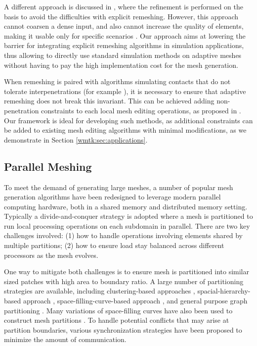 A different approach is discussed in \cite{Grinspun:2002}, where the refinement is performed on the basis to avoid the difficulties with explicit remeshing. However, this approach cannot coarsen a dense input, and also cannot increase the quality of elements, making it usable only for specific scenarios \cite{Grinspun:2002}. Our approach aims at lowering the barrier for integrating explicit remeshing algorithms in simulation applications, thus allowing to directly use standard simulation methods on adaptive meshes without having to pay the high implementation cost for the mesh generation.

When remeshing is paired with algorithms simulating contacts that do not tolerate interpenetrations (for example \cite{Li2020IPC}), it is necessary to ensure that adaptive remeshing does not break this invariant. This can be achieved adding non-penetration constraints to each local mesh editing operations, as proposed in \cite{Brochu:2012}. Our framework is ideal for developing such methods, as additional constraints can be added to existing mesh editing algorithms with minimal modifications, as we demonstrate in Section \ref{wmtk:sec:applications}.


\subsection{Parallel Meshing}

To meet the demand of generating large meshes,
a number of popular mesh generation algorithms have been redesigned to
leverage modern parallel computing hardware, both in a shared memory and distributed memory setting. Typically a divide-and-conquer strategy is adopted where a mesh is partitioned to run local processing operations
on each subdomain in parallel.  There are two key challenges involved: (1) how to
handle operations involving elements shared by multiple partitions; (2) how to
ensure load stay balanced across different processors as the mesh evolves.

One way to mitigate both challenges is to ensure mesh is partitioned into
similar sized patches with high area to boundary ratio.
A large number of partitioning strategies are available, including
clustering-based approaches \cite{Mahmoud2021}, spacial-hierarchy-based approach
\cite{loseille2017unique,lo2012parallel}, space-filling-curve-based approach
\cite{marot2019one,borrell2018parallel}, and general purpose graph partitioning \cite{karypis1998fast}. Many variations of space-filling curves have also been used to construct mesh partitions \cite{chrisochoides2006parallel, aluru1997parallel}.
%
To handle potential conflicts that may arise at partition boundaries,
various synchronization strategies have been proposed
\cite{okusanya1996parallel,chrisochoides2003parallel,chrisochoides2006parallel} to minimize the amount of
communication.
%

